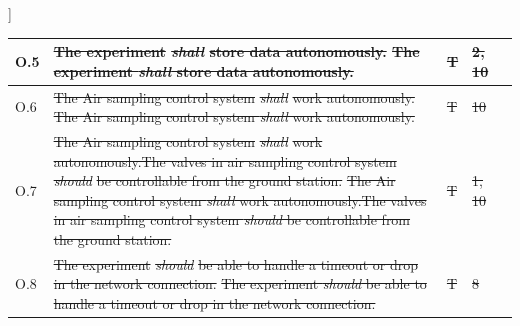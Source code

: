 ]\documentclass[a4paper,12pt,twoside]{article}
\providecommand{\DIFaddtex}[1]{{\protect\color{blue}\uwave{#1}}} %
\providecommand{\DIFdeltex}[1]{{\protect\color{red}\sout{#1}}}                      %
\providecommand{\DIFaddbegin}{} %
\providecommand{\DIFaddend}{} %
\providecommand{\DIFdelbegin}{} %
\providecommand{\DIFdelend}{} %
\providecommand{\DIFadd}[1]{\texorpdfstring{\DIFaddtex{#1}}{#1}} %
\providecommand{\DIFdel}[1]{\texorpdfstring{\DIFdeltex{#1}}{}} %
\newcommand{\DIFscaledelfig}{0.5}
\newlength{\DIFdelgraphicswidth} %
\newlength{\DIFdelgraphicsheight} %
\newcommand{\DIFaddincludegraphics}[2][]{{\color{blue}\fbox{\DIFOincludegraphics[#1]{#2}}}} %
\newcommand{\DIFdelincludegraphics}[2][]{%
\sbox{\DIFdelgraphicsbox}{\DIFOincludegraphics[#1]{#2}}%
\settoboxwidth{\DIFdelgraphicswidth}{\DIFdelgraphicsbox} %
\settoboxtotalheight{\DIFdelgraphicsheight}{\DIFdelgraphicsbox} %
\scalebox{\DIFscaledelfig}{%
\parbox[b]{\DIFdelgraphicswidth}{\usebox{\DIFdelgraphicsbox}\\[-\baselineskip] \rule{\DIFdelgraphicswidth}{0em}}\llap{\resizebox{\DIFdelgraphicswidth}{\DIFdelgraphicsheight}{%
\setlength{\unitlength}{\DIFdelgraphicswidth}%
\begin{picture}(1,1)%
\thicklines\linethickness{2pt} %
{\color[rgb]{1,0,0}\put(0,0){\framebox(1,1){}}}%
{\color[rgb]{1,0,0}\put(0,0){\line( 1,1){1}}}%
{\color[rgb]{1,0,0}\put(0,1){\line(1,-1){1}}}%
\end{picture}%
}\hspace*{3pt}}} %
} %
\DeclareRobustCommand{\DIFaddbegin}{\DIFOaddbegin \let\includegraphics\DIFaddincludegraphics} %
\DeclareRobustCommand{\DIFaddend}{\DIFOaddend \let\includegraphics\DIFOincludegraphics} %
\DeclareRobustCommand{\DIFdelbegin}{\DIFOdelbegin \let\includegraphics\DIFdelincludegraphics} %
\DeclareRobustCommand{\DIFdelend}{\DIFOaddend \let\includegraphics\DIFOincludegraphics} %
\begin{document}
\begin{longtable}[]{|m{}| m{} |m{} |m{}|m{}|}
O.5  & \DIFdelbegin \DIFdel{The experiment }\textit{\DIFdel{shall}} %
\DIFdel{store data autonomously.                                                                                                                }\DIFdelend \DIFaddbegin \st{The experiment \textit{shall} store data autonomously.}\DIFadd{\textsuperscript{\ref{fn:unnecessary-requirement}}                                                                                                                }\DIFaddend &       \DIFdelbegin \DIFdel{T       }\DIFdelend \DIFaddbegin \DIFadd{- }\DIFaddend & \DIFdelbegin \DIFdel{2, 10            }\DIFdelend \DIFaddbegin \DIFadd{-            }\DIFaddend &        \\ \hline
O.6  & \DIFdelbegin \DIFdel{The Air sampling control system }\textit{\DIFdel{shall}} %
\DIFdel{work autonomously.                                                                                                     }\DIFdelend \DIFaddbegin \st{The Air sampling control system \textit{shall} work autonomously.}\DIFadd{\textsuperscript{\ref{fn:unnecessary-requirement}}                                                                                                     }\DIFaddend &       \DIFdelbegin \DIFdel{T      }\DIFdelend \DIFaddbegin \DIFadd{-     }\DIFaddend &  \DIFdelbegin \DIFdel{10            }\DIFdelend \DIFaddbegin \DIFadd{-          }\DIFaddend &        \\ \hline
O.7  & \DIFdelbegin \DIFdel{The Air sampling control system }\textit{\DIFdel{shall}} %
\DIFdel{work autonomously.The valves in air sampling control system }\textit{\DIFdel{should}} %
\DIFdel{be controllable from the ground station. }\DIFdelend \DIFaddbegin \st{The Air sampling control system \textit{shall} work autonomously.The valves in air sampling control system \textit{should} be controllable from the ground station.}\DIFadd{\textsuperscript{\ref{fn:unnecessary-requirement}} }\DIFaddend &      \DIFdelbegin \DIFdel{T        }\DIFdelend \DIFaddbegin \DIFadd{-       }\DIFaddend &   \DIFdelbegin \DIFdel{1, 10            }\DIFdelend \DIFaddbegin \DIFadd{-         }\DIFaddend &        \\ \hline
O.8  & \DIFdelbegin \DIFdel{The experiment }\textit{\DIFdel{should}} %
\DIFdel{be able to handle a timeout or drop in the network connection.                                                                         }\DIFdelend \DIFaddbegin \st{The experiment \textit{should} be able to handle a timeout or drop in the network connection.}\DIFadd{\textsuperscript{\ref{fn:unnecessary-requirement}}                                                                         }\DIFaddend &    \DIFdelbegin \DIFdel{T          }\DIFdelend \DIFaddbegin \DIFadd{-         }\DIFaddend &  \DIFdelbegin \DIFdel{8           }\DIFdelend \DIFaddbegin \DIFadd{-  }\DIFaddend &        \\ \hline

\end{longtable}
\end{document}
